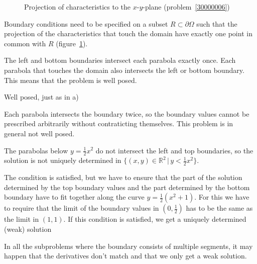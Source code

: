 \begin{loesung}
\begin{figure}
\begin{center}
\end{center}
\caption{Projection of characteristics to the $x$-$y$-plane
(problem~\ref{30000006})
\label{30000006:char}}
\end{figure}
Boundary conditions need to be specified on a subset
$R\subset \partial\Omega$ such that the projection of the
characteristics that touch the domain have exactly one
point in common with $R$
(figure~\ref{30000006:char}). 
\begin{teilaufgaben}
\item
The left and bottom boundaries intersect each parabola exactly once.
Each parabola that touches the domain also intersects the left or bottom
boundary.
This means that the problem is well posed.
\item
Well posed, just as in a)
\item
Each parabola intersects the boundary twice, so the boundary values
cannot be prescribed arbitrarily without contraticting themselves.
This problem is in general not well posed.
\item
The parabolas below $y=\frac12x^2$ do not intersect the left and top
boundaries, so the solution is not uniquely determined in
$\{(x,y)\in\mathbb R^2\,|\, y<\frac12x^2\}$.
\item 
The condition is satisfied, but we have to ensure that the part of
the solution determined by the top boundary values and the
part determined by the bottom boundary have to fit together along
the curve $y=\frac12(x^2+1)$.
For this we have to require that the limit of the boundary values
in $(0,\frac12)$ has to be the same as the limit in $(1,1)$.
If this condition is satisfied, we get a uniquely determined 
(weak) solution
\end{teilaufgaben}
In all the subproblems where the boundary consists of multiple segments,
it may happen that the derivatives don't match and that we only get
a weak solution.
\end{loesung}
